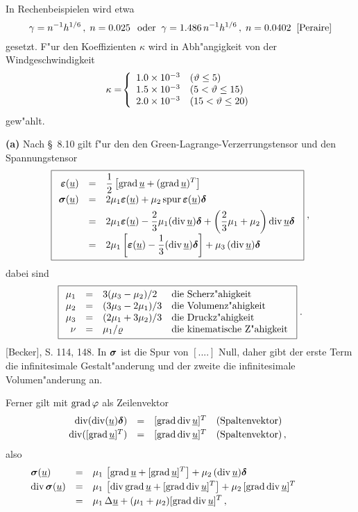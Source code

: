 \documentclass[12pt,a4paper,leqno,twoside]{book}
\begin{document}
In Rechenbeispielen wird etwa
\[
\gamma = \dis n^{-1}h^{1/6}\,, \; n = 0.025\,\;\; \text{oder}\;\;
\gamma = \dis 1.486\,n^{-1}h^{1/6}\,,\; n = 0.0402 \; \; \text{[Peraire]}
\]
gesetzt. F"ur den Koeffizienten $\kappa$ wird in Abh"angigkeit von der 
Windgeschwindigkeit
\[
\kappa = \ \ba{\{}{ll}
1.0 \times 10^{-3} & (\theta \leq 5)\\
1.5 \times 10^{-3} & (5 < \theta \leq 15)\\
2.0 \times  10^{-3} & (15 < \theta \leq  20)
\ea{.}
\]
%
gew"ahlt.
\par
{\bf (a)} Nach \S\, 8.10 gilt f"ur den
den {\sc Green-Lagrange}-Verzer\-rungs\-tensor und
den Spannungstensor 
%
\begin{equation} \label{e1}
\fbox{$\
\ba{.}{rcl}
\eps(\u) &=& \dis \frac{1}{2}\left[\grad \u + (\grad \u)^T\right]\\[1ex]
\sig( \u) &=& 2 \mu_1 \eps (\u) + \mu_2 \spur \eps (\u)\del\\[1ex]
%
&=& \dis 2 \mu_1 \eps (\u ) - \frac{2}{3}\mu_1 (\div \u )\del
 + \left(\frac{2}{3} \mu_1 + \mu_2 \right) \div \u \del\\[1ex]
%
&=& \dis 2 \mu_1\left[ \eps (\u ) - \frac{1}{3} (\div \u )\del\right]
 + \mu_3 \, (\div \u)\del
\ea{.}
$}\; ,
\end{equation}
%
dabei sind
%
\[
\fbox{$\
\ba{.}{rcll}
\mu _1&=& 3(\mu_3 - \mu_2)/2   & \mbox{die Scherz"ahigkeit}\\
\mu_2 &=& (3\mu_3 - 2\mu_1)/3  & \mbox{die Volumenz"ahigkeit}\\
\mu_3&=& (2\mu _1 + 3\mu _2)/3 &\mbox{die Druckz"ahigkeit}\\
\nu &=&\mu_1/\rho & \mbox{die kinematische Z"ahigkeit}
\ea{.}
$} \; .
\]
%
[Becker], S. 114, 148.
In $\sig$ ist die Spur von $[....]$ Null, daher gibt der erste Term die
in\-fini\-tesi\-male Ge\-stalt\-"ande\-rung und der zweite die infinitesimale
Volumen"anderung an.
\par\vspace{0.5ex}
Ferner gilt mit $\grad \phi$ als Zeilenvektor
%
\[
\ba{.}{rcl}
\div (\div (\u)\del) &=& [\grad \div \u]^T \quad \mbox{(Spaltenvektor)}
\\[0.5ex]
\div([\grad \u]^T) &=& [\grad \div \u]^T \quad \mbox{(Spaltenvektor)}\,,
\ea{.}
\]
also
%
\begin{equation}\label{e2}
\ba{.}{lll}
\sig(\u)
&=& \dis \mu_1\, \left[ \grad \u +  [\grad \u]^T\right]
+ \mu_2 \, (\div \u)\del\\[0.5ex]
%
\div \sig(\u)
&=& \dis \mu_1 \, \left[\div \grad \u + [\grad \div \u]^T\right]
+ \mu_2 \, [\grad \div \u]^T\\[0.5ex]
&=& \dis \mu_1 \,\Delta \u + (\mu_1 + \mu_2)[\grad \div \u]^T\,,
\ea{.}\hspace{7ex}
\end{equation}
\end{document}
